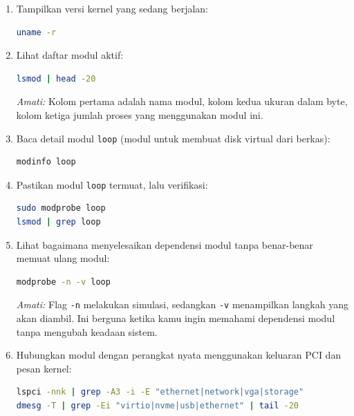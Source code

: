 \begin{enumerate}
    \item Tampilkan versi kernel yang sedang berjalan:
\begin{lstlisting}[language=bash, caption={Versi kernel aktif}]
uname -r
\end{lstlisting}

    \item Lihat daftar modul aktif:
\begin{lstlisting}[language=bash, caption={Daftar modul kernel aktif}]
lsmod | head -20
\end{lstlisting}
    \textit{Amati:} Kolom pertama adalah nama modul, kolom kedua ukuran dalam byte, kolom ketiga jumlah proses yang menggunakan modul ini.

    \item Baca detail modul \texttt{loop} (modul untuk membuat disk virtual dari berkas):
\begin{lstlisting}[language=bash, caption={Detail modul loop}]
modinfo loop
\end{lstlisting}

    \item Pastikan modul \texttt{loop} termuat, lalu verifikasi:
\begin{lstlisting}[language=bash, caption={Muat dan verifikasi modul loop}]
sudo modprobe loop
lsmod | grep loop
\end{lstlisting}

    \item Lihat bagaimana  menyelesaikan dependensi modul tanpa benar-benar memuat ulang modul:
\begin{lstlisting}[language=bash, caption={Simulasi pemuatan modul dan dependensinya}]
modprobe -n -v loop
\end{lstlisting}
    \textit{Amati:} Flag \texttt{-n} melakukan simulasi, sedangkan \texttt{-v} menampilkan langkah yang akan diambil. Ini berguna ketika kamu ingin memahami dependensi modul tanpa mengubah keadaan sistem.

    \item Hubungkan modul dengan perangkat nyata menggunakan keluaran PCI dan pesan kernel:
\begin{lstlisting}[language=bash, caption={Hubungkan modul, perangkat, dan pesan kernel}]
lspci -nnk | grep -A3 -i -E "ethernet|network|vga|storage"
dmesg -T | grep -Ei "virtio|nvme|usb|ethernet" | tail -20
\end{lstlisting}
\end{enumerate}

